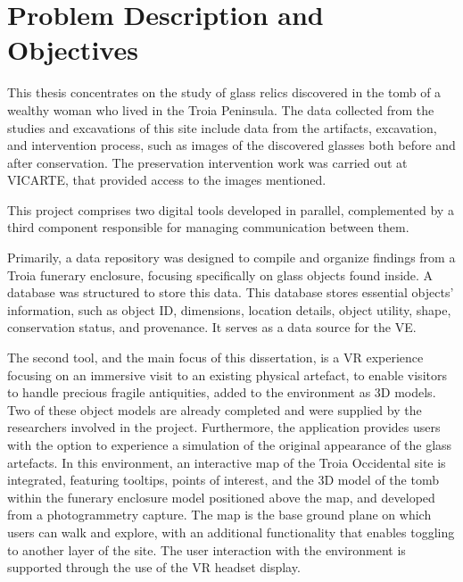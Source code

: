 
\section{Problem Description and Objectives}
\label{sec:problem_description} 
This thesis concentrates on the study of glass relics discovered in the tomb of a wealthy woman who lived in the Troia Peninsula. The data collected from the studies and excavations of this site include 
data from the artifacts, excavation, and intervention process, such as images of the discovered glasses both before and after conservation. 
The preservation intervention work was carried out at \gls{VICARTE}, that provided access to the images mentioned.

This project comprises two digital tools developed in parallel, complemented by a third component responsible for managing communication between them.

Primarily, a data repository was designed to compile and organize findings from a Troia funerary enclosure, focusing specifically on glass objects found inside. A database was structured to store this data. 
This database stores essential objects' information, such as object ID, dimensions, location details, object utility, shape, 
conservation status, and provenance. It serves as a data source for the \gls{VE}.

The second tool, and the main focus of this dissertation, is a \gls{VR} experience focusing on an immersive visit to an existing physical 
artefact, to enable visitors to handle precious fragile antiquities, added to the environment as \gls{3D} models. 
Two of these object models are already completed and were supplied by the researchers involved in the project.
Furthermore, the application provides users with the option to experience a simulation of the original appearance of the glass artefacts.
In this environment, an interactive map of the Troia Occidental site is integrated, featuring tooltips, points of interest, and the \gls{3D} model of the tomb within the funerary enclosure model positioned above the map, and developed from a photogrammetry capture. 
The map is the base ground plane on which users can walk and explore, with an additional functionality that enables toggling to another layer of the site.
The user interaction with the environment is supported through the use of the \gls{VR} headset display.

